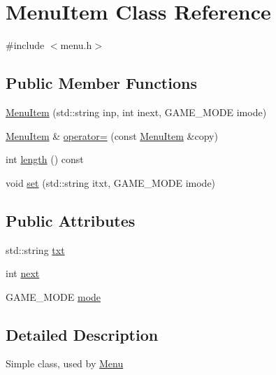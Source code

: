 \hypertarget{class_menu_item}{\section{Menu\-Item Class Reference}
\label{class_menu_item}
}


{\ttfamily \#include $<$menu.\-h$>$}

\subsection*{Public Member Functions}
\begin{DoxyCompactItemize}
\item 
\hyperlink{class_menu_item_a395820682db1632e94c20dfbebcb2936}{Menu\-Item} (std\-::string inp, int inext, G\-A\-M\-E\-\_\-\-M\-O\-D\-E imode)
\item 
\hyperlink{class_menu_item}{Menu\-Item} \& \hyperlink{class_menu_item_a18aed0de2b79f1c1bba81d8b1a24416a}{operator=} (const \hyperlink{class_menu_item}{Menu\-Item} \&copy)
\item 
int \hyperlink{class_menu_item_a09b97039ae811075d7fe9e4320841126}{length} () const 
\item 
void \hyperlink{class_menu_item_a9473674ab64b050cce9e495e8aeb4544}{set} (std\-::string itxt, G\-A\-M\-E\-\_\-\-M\-O\-D\-E imode)
\end{DoxyCompactItemize}
\subsection*{Public Attributes}
\begin{DoxyCompactItemize}
\item 
std\-::string \hyperlink{class_menu_item_ab7c37bd62ab20b28def5f0f8596a0504}{txt}
\item 
int \hyperlink{class_menu_item_afed5cf8923dfc7a3fe6f05f1c5bbb1db}{next}
\item 
G\-A\-M\-E\-\_\-\-M\-O\-D\-E \hyperlink{class_menu_item_a36a3108f1bcce16b57d41bea1cff0137}{mode}
\end{DoxyCompactItemize}


\subsection{Detailed Description}
Simple class, used by \hyperlink{class_menu}{Menu} 

